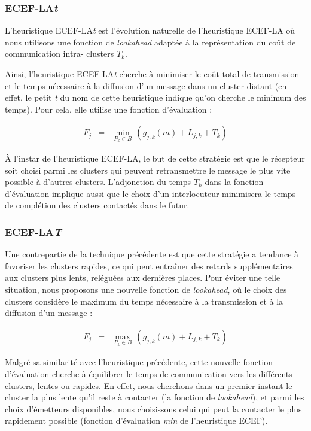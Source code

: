 \subsubsection*{ECEF-LA\emph{t}}

L'heuristique ECEF-LA\emph{t} est l'évolution naturelle de l'heuristique
ECEF-LA où nous utilisons une fonction de \emph{lookahead} adaptée
à la représentation du coût de communication intra- clusters $T_{k}$. 

Ainsi, l'heuristique ECEF-LA\emph{t} cherche à minimiser le coût total
de transmission et le temps nécessaire à la diffusion d'un message
dans un  cluster distant (en effet, le \og petit \emph{t} \fg{}
du nom de cette heuristique indique qu'on cherche le minimum des temps).
Pour cela, elle utilise une fonction d'évaluation :

\begin{eqnarray*}
	F_{j} & = & \min_{P_{k}\in B}\,(g_{j,k}(m)+L_{j,k}+T_{k})\end{eqnarray*}


À l'instar de l'heuristique ECEF-LA, le but de cette stratégie est
que le récepteur soit choisi parmi les  clusters qui peuvent retransmettre
le message le plus vite possible à d'autres  clusters. L'adjonction
du temps $T_{k}$ dans la fonction d'évaluation implique aussi que
le choix d'un interlocuteur minimisera le temps de complétion des
 clusters contactés dans le futur. 


\subsubsection*{ECEF-LA\emph{T}}

Une contrepartie de la technique précédente est que cette stratégie
a tendance à favoriser les  clusters rapides, ce qui peut entraîner
des retards supplémentaires aux  clusters plus lents, reléguées aux
dernières places. Pour éviter une telle situation, nous proposons
une nouvelle fonction de \emph{lookahead}, où le choix des  clusters
considère le maximum du temps nécessaire à la transmission et à la
diffusion d'un message : 

\begin{eqnarray*}
	F_{j} & = & \max_{P_{k}\in B}\,(g_{j,k}(m)+L_{j,k}+T_{k})\end{eqnarray*}


Malgré sa similarité avec l'heuristique précédente, cette nouvelle
fonction d'évaluation cherche à équilibrer le temps de communication
vers les différents  clusters, lentes ou rapides. En effet, nous cherchons
dans un premier instant le  cluster la plus lente qu'il reste à contacter
(la fonction de \emph{lookahead}), et parmi les choix d'émetteurs
disponibles, nous choisissons celui qui peut la contacter le plus
rapidement possible (fonction d'évaluation \emph{min} de l'heuristique
ECEF).

